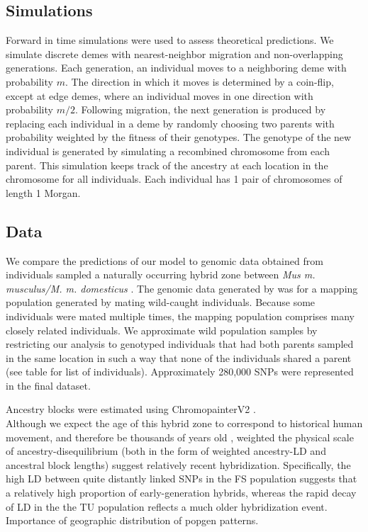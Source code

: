 \documentclass[12pt]{amsart}
\begin{document}
\subsection{Simulations}
Forward in time simulations were used to assess theoretical predictions. We simulate discrete demes with nearest-neighbor migration and non-overlapping generations. Each generation, an individual moves to a neighboring deme with probability $m$. The direction in which it moves is determined by a coin-flip, except at edge demes, where an individual moves in one direction with probability $m/2$. Following migration, the next generation is produced by replacing each individual in a deme by randomly choosing two parents with probability weighted by the fitness of their genotypes. The genotype of the new individual is generated by simulating a recombined chromosome from each parent. This simulation keeps track of the ancestry at each location in the chromosome for all individuals. Each individual has 1 pair of chromosomes of length 1 Morgan. 

\subsection{Data}
We compare the predictions of our model to genomic data obtained from individuals sampled a naturally occurring hybrid zone between \emph{Mus m. musculus/M. m. domesticus} \cite{Turner2011,Turner2014}. The genomic data generated by \citep{Turner2014} was for a mapping population generated by mating wild-caught individuals. Because some individuals were mated multiple times, the mapping population comprises many closely related individuals. We approximate wild population samples by restricting our analysis to genotyped individuals that had both parents sampled in the same location in such a way that none of the individuals shared a parent (see table for list of individuals). Approximately 280,000 SNPs were represented in the final dataset. 

Ancestry blocks were estimated using ChromopainterV2 \cite{Lawson2012}. \\

Although we expect the age of this hybrid zone to correspond to historical human movement, and therefore be thousands of years old \cite{Teschke2008}, weighted the physical scale of ancestry-disequilibrium (both in the form of weighted ancestry-LD \citep{Loh2013} and ancestral block lengths) suggest relatively recent hybridization. Specifically, the high LD between quite distantly linked SNPs in the FS population suggests that a relatively high proportion of early-generation hybrids, whereas the rapid decay of LD in the the TU population reflects a much older hybridization event. Importance of geographic distribution of popgen patterns. 
\end{document}
